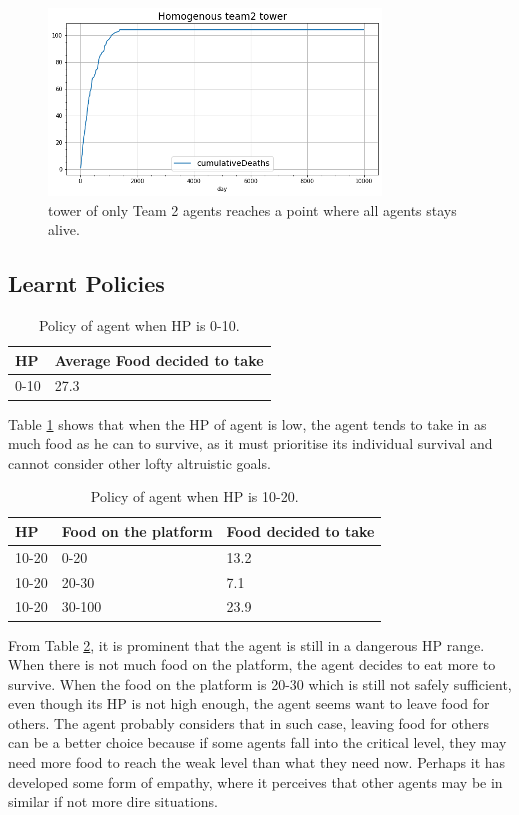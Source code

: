 \begin{figure}
\centering
\includegraphics{004_team_2_agent_design/252team2}
\caption{tower of only Team 2 agents reaches a point where all agents stays alive.}
\label{252team2}
\end{figure}

\subsection{Learnt Policies}
\begin{table}
\centering
\caption{Policy of agent when HP is 0-10.}
\label{lowhp-team2}
\begin{tabular}{@{}ll@{}}
\toprule
HP   & Average Food decided to take \\ \midrule
0-10 & 27.3                         \\ \bottomrule
\end{tabular}
\end{table}
Table \ref{lowhp-team2} shows that when the HP of agent is low, the agent tends to take in as much food as he can to survive, as it must prioritise its individual survival and cannot consider other lofty altruistic goals.

\begin{table}[]
\centering
\caption{Policy of agent when HP is 10-20.}
\label{midhp-team2}
\begin{tabular}{@{}lll@{}}
\toprule
HP    & Food on the platform & Food decided to take \\ \midrule
10-20 & 0-20                 & 13.2                 \\
10-20 & 20-30                & 7.1                  \\
10-20 & 30-100               & 23.9                 \\ \bottomrule
\end{tabular}
\end{table}

From Table \ref{midhp-team2}, it is prominent that the agent is still in a dangerous HP range. When there is not much food on the platform, the agent decides to eat more to survive.
When the food on the platform is 20-30 which is still not safely sufficient, even though its HP is not high enough, the agent seems want to leave food for others. The agent probably considers that in such case, leaving food for others can be a better choice because if some agents fall into the critical level, they may need more food to reach the weak level than what they need now. Perhaps it has developed some form of empathy, where it perceives that other agents may be in similar if not more dire situations. 

